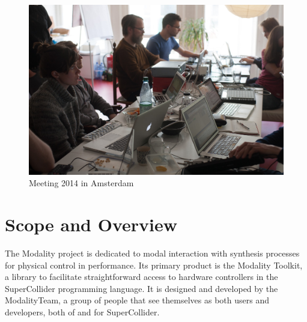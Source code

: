 \documentclass{article}
\title{\papertitle}
\begin{document}
%
\capstartfalse
\maketitle
\capstarttrue
%
\begin{abstract}
The Modality toolkit aims to improve and facilitate the use of digital technology within interactive sound art and music. 
Written in SuperCollider, it simplifies the creation of individual electronic instruments by combining custom sound engines with off-the-shelf controllers. 
To this end, a common code interface, |MKtl|, is used to connect controllers from various sources and protocols. 
Currently, HID and MIDI are supported; GUI-based interfaces can be created on the fly from interface descriptions.
\end{abstract}

\begin{figure}[h]
	\centering
		\includegraphics[width=.9\columnwidth]{../media/20140331-IMG_5976.jpg}
	\caption{Meeting 2014 in Amsterdam}
	\label{fig:media_20140331-IMG_5976}
\end{figure}

\section{Scope and Overview}
\label{sec:overview_of_modality_concept_and_aims}

The Modality project is dedicated to modal interaction with synthesis processes for physical control in performance. 
Its primary product is the Modality Toolkit, a library to facilitate straightforward access to hardware controllers in the SuperCollider programming language. 
It is designed and developed by the ModalityTeam, a group of people that see themselves as both users and developers, both of and for SuperCollider.
\end{document}
